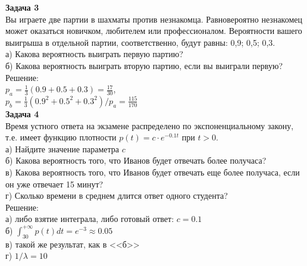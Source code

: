 \documentclass[pdftex,12pt,a4paper]{article}
\begin{document}

\textbf{Задача 3} \\ %
Вы играете две партии в шахматы против незнакомца. Равновероятно
незнакомец может оказаться новичком, любителем или профессионалом.
Вероятности вашего выигрыша в отдельной партии, соответственно,
будут равны: 0,9; 0,5; 0,3. \\
а) Какова вероятность выиграть первую партию? \\
б) Какова вероятность выиграть вторую партию, если вы выиграли
первую? \\
Решение: \\
$p_{a}=\frac{1}{3}(0.9+0.5+0.3)=\frac{17}{30}$, \\
$p_{b}=\frac{1}{3}(0.9^{2}+0.5^{2}+0.3^{2})/p_{a}=\frac{115}{170}$ \\


\textbf{Задача 4} \\ %
Время устного ответа на экзамене распределено по экспоненциальному закону, т.е. имеет функцию плотности $p(t)=c\cdot e^{-0.1t}$ при $t>0$. \\
а) Найдите значение параметра $c$ \\
б) Какова вероятность того, что Иванов будет отвечать более получаса? \\
в) Какова вероятность того, что Иванов будет отвечать еще более получаса, если он уже отвечает 15 минут? \\
г) Сколько времени в среднем длится ответ одного студента? \\
Решение: \\
а) либо взятие интеграла, либо готовый ответ: $c=0.1$ \\
б) $\int_{30}^{+\infty}p(t)dt=e^{-3}\approx 0.05$ \\
в) такой же результат, как в <<б>> \\
г) $1/\lambda=10$ \\

\end{document}
